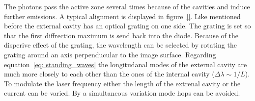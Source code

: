 The photons pass the active zone several times because of the cavities and induce further emissions. A typical alignment is displayed in figure~\ref{}.
Like mentioned before the external cavity has an optical grating on one side. The grating is set so that the first diffrection maximum is send back into the
diode. Because of the disperive effect of the grating, the wavelength can be selected by rotating the grating around an axis perpenducular
to the image surface. Regarding equation~\eqref{eq: standing_waves} the longitudanal modes of the external cavity are much
more closely to each other than the ones of the internal cavity ($\Delta \lambda \sim 1 / L$).
To modulate the laser frequency either the length of the extrenal cavity or the current can be varied. By a simultaneous variation
mode hops can be avoided.
